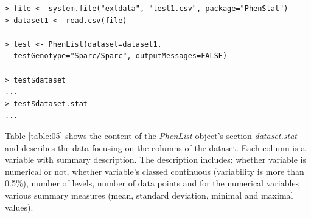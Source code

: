 \documentclass[12pt,a4paper]{article}
\begin{document}
\begingroup
    \fontsize{8pt}{12pt}\selectfont
\begin{verbatim}
> file <- system.file("extdata", "test1.csv", package="PhenStat") 
> dataset1 <- read.csv(file)

> test <- PhenList(dataset=dataset1,
  testGenotype="Sparc/Sparc", outputMessages=FALSE)

> test$dataset
...
> test$dataset.stat
...
\end{verbatim}
\endgroup
Table \ref{table:05} shows the content of the \textit{PhenList} object's section \textit{dataset.stat}  and describes the data focusing on the columns of the dataset. Each column is a variable with summary description. 
The description includes: whether variable is numerical or not, whether variable's classed continuous (variability is more than 0.5\%), number of levels, number of data points and for the numerical variables various summary measures (mean, standard deviation, minimal and maximal values).
\end{document}
